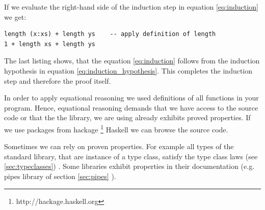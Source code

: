 \begin{description}
If we evaluate the right-hand side of the induction step in equation  \ref{eq:induction} we get:
\begin{program}
\begin{verbatim}
length (x:xs) + length ys    -- apply definition of length
1 + length xs + length ys
\end{verbatim}
\end{program}

The last listing shows, that the equation \ref{eq:induction} follows from the induction hypothesis in equation \ref{eq:induction_hypothesis}. This completes the induction step and therefore the proof itself.
\end{description}

In order to apply equational reasoning we used definitions of all functions in your program. Hence, equational reasoning demands that we have access to the source code or that the the library, we are using already exhibits proved properties. If we use packages from hackage \footnote{http://hackage.haskell.org} Haskell we can browse the source code. 

Sometimes we can rely on proven properties. For example all types of the standard library, that are instance of a type class, satisfy the type class laws (see \ref{sec:typeclasses}) \cite{yorgey}. Some libraries exhibit properties in their documentation (e.g. pipes library of section \ref{sec:pipes} \cite{gonzales13}). 